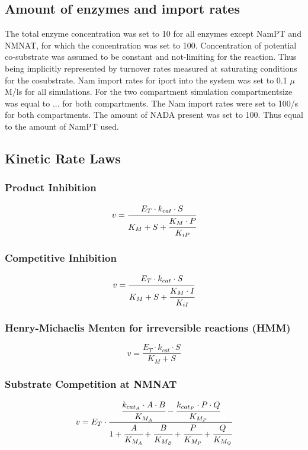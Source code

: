 \documentclass[a4paper,10pt]{article}
\begin{document}
\subsection*{Amount of enzymes and import rates}
The total enzyme concentration was set to 10 for all enzymes except NamPT and NMNAT, for which the concentration was set to 100. Concentration of potential co-substrate was assumed to be constant and not-limiting for the reaction. Thus being implicitly represented by turnover rates measured at saturating conditions for the cosubstrate. Nam import rates for iport into the system was set to 0.1 $\mu$M/ls for all simulations. For the two compartment simulation compartmentsize was equal to ... for both compartments. The Nam import rates were set to 100/s for both compartments. The amount of NADA present was set to 100. Thus equal to the amount of NamPT used.

\subsection*{Kinetic Rate Laws}


\subsubsection*{Product Inhibition}
\begin{equation}
v=\cfrac{E_T\cdot k_{cat}\cdot S}{K_M + S + \cfrac{K_M\cdot P}{K_{iP}} }
\end{equation}

\subsubsection*{Competitive Inhibition}
\begin{equation}
v=\cfrac{E_T\cdot k_{cat}\cdot S}{K_M + S + \cfrac{K_M\cdot I}{K_{iI}} }
\end{equation}


\subsubsection*{Henry-Michaelis Menten for irreversible reactions (HMM)}
\begin{equation}
v=\frac{E_T\cdot k_{cat}\cdot S}{K_M + S}
\end{equation}


\subsubsection*{Substrate Competition at NMNAT}
\begin{equation}
v=E_T \cdot \cfrac{\cfrac{k_{{cat}_{A}}\cdot A \cdot
B}{K_{{M}_A}}-\cfrac{k_{{cat}_{P}}\cdot P \cdot
Q}{K_{{M}_P}}}{1+\cfrac{A}{K_{{M}_A}}+\cfrac{B}{K_{{M}_B}}+\cfrac{P}{K_{{M}_P}}+\cfrac{Q}{K_{{M}_Q}}}
\end{equation}





\end{document}
